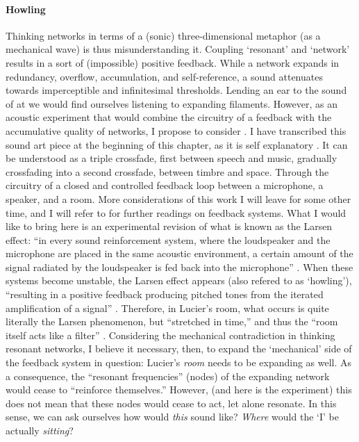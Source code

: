 \paragraph{Howling}
Thinking networks in terms of a (sonic) three-dimensional metaphor (as a mechanical wave) is thus misunderstanding it. Coupling `resonant' and `network' results in a sort of (impossible) positive feedback. While a network expands in redundancy, overflow, accumulation, and self-reference, a sound attenuates towards imperceptible and infinitesimal thresholds. Lending an ear to the sound of \gls{at} we would find ourselves listening to expanding filaments. However, as an acoustic experiment that would combine the circuitry of a feedback with the accumulative quality of networks, I propose to consider  . I have transcribed this sound art piece at the beginning of this chapter, as it is self explanatory . It can be understood as a triple crossfade, first between speech and music, gradually crossfading into a second crossfade, between timbre and space. Through the circuitry of a closed and controlled feedback loop between a microphone, a speaker, and a room. More considerations of this work I will leave for some other time, and I will refer to \textcite{icmc/bbp2372.2012.006} for further readings on feedback systems. What I would like to bring here is an experimental revision of what is known as the Larsen effect: ``in every sound reinforcement system, where the loudspeaker and the microphone are placed in the same acoustic environment, a certain amount of the signal radiated by the loudspeaker is fed back into the microphone'' \parencite[11]{Kro11:Aco}. When these systems become unstable, the Larsen effect appears (also refered to as `howling'), ``resulting in a positive feedback producing pitched tones from the iterated amplification of a signal'' \parencite[31]{icmc/bbp2372.2012.006}. Therefore, in Lucier's room, what occurs is quite literally the Larsen phenomenon, but ``stretched in time,'' and thus the ``room itself acts like a filter'' \parencite[34]{icmc/bbp2372.2012.006}. Considering the mechanical contradiction in thinking resonant networks, I believe it necessary, then, to expand the `mechanical' side of the feedback system in question: Lucier's \textit{room} needs to be expanding as well. As a consequence, the ``resonant frequencies'' (nodes) of the expanding network would cease to ``reinforce themselves.'' However, (and here is the experiment) this does not mean that these nodes would cease to act, let alone resonate. In this sense, we can ask ourselves how would \textit{this} sound like? \textit{Where} would the `I' be actually \textit{sitting}?


